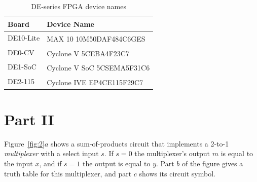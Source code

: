\documentclass[epsfig,10pt,fullpage]{article}
\begin{document}
\begin{table}[H]
	\begin{center}
	\begin{tabular}{l | l}
   \bf{Board} & \bf{Device Name} \\
	\hline
	\rule{0pt}{3ex}DE10-Lite & MAX\textsuperscript{\textregistered} 10 10M50DAF484C6GES \\
	DE0-CV & Cyclone\textsuperscript{\textregistered} V 5CEBA4F23C7 \\
	DE1-SoC & Cyclone\textsuperscript{\textregistered} V SoC 5CSEMA5F31C6 \\
	DE2-115 & Cyclone\textsuperscript{\textregistered} IVE EP4CE115F29C7 \\
	\end{tabular}
	\end{center}
	\caption{DE-series FPGA device names}
	\label{tab:device}
\end{table}

\section*{Part II}
Figure~\ref{fig:2}$a$ shows a sum-of-products circuit that implements
a 2-to-1 {\it multiplexer} with a select input $s$.
If $s = 0$ the multiplexer's output $m$ is equal to the input $x$, and if $s=1$ the
output is equal to $y$. Part $b$ of the figure gives a truth table for this
multiplexer, and part $c$ shows its circuit symbol. 
\end{document}
